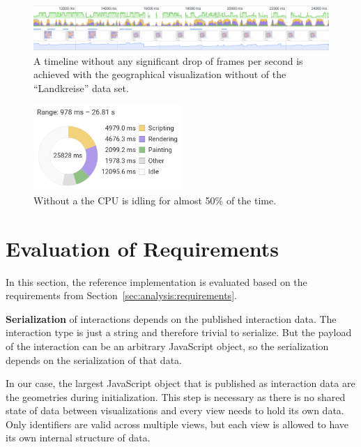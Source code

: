 \begin{figure}[h]
  \centering
  \includegraphics[width=\textwidth]{figures/evaluation/performance/profiles/landkreise_geo_only/fps}
  \caption{
    A timeline without any significant drop of frames per second is achieved with the geographical visualization without \tmap{} of the ``Landkreise'' data set.
  }\label{fig:evaluation:performance:profiling:landkreise_geo_only:fps}
\end{figure}

\begin{figure}[h]
  \centering
  \includegraphics[width=0.5\textwidth]{figures/evaluation/performance/profiles/landkreise_geo_only/summary}
  \caption{
    Without a \tmap{} the CPU is idling for almost 50\% of the time.
  }\label{fig:evaluation:performance:profiling:landkreise_both:summary}
\end{figure}



\section{Evaluation of Requirements}\label{sec:evaluation:requirements}
In this section, the reference implementation is evaluated based on the requirements from Section~\ref{sec:analysis:requirements}.

\textbf{Serialization} of interactions depends on the published interaction data.
The interaction type is just a string and therefore trivial to serialize.
But the payload of the interaction can be an arbitrary JavaScript object, so the serialization depends on the serialization of that data.

In our case, the largest JavaScript object that is published as interaction data are the geometries during initialization.
This step is necessary as there is no shared state of data between visualizations and every view needs to hold its own data.
Only identifiers are valid across multiple views, but each view is allowed to have its own internal structure of data.


